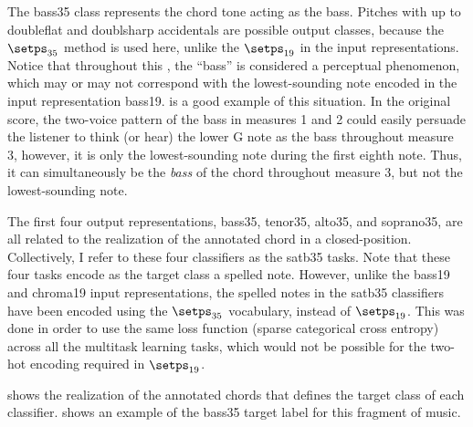 
The \gls{bass35} class represents the chord tone acting as
the bass. Pitches with up to \gls{doubleflat} and
\gls{doublsharp} accidentals are possible output classes,
because the $\setps_{35}$ method is used here, unlike the
$\setps_{19}$ in the input representations. Notice that
throughout this \thesisdiss{}, the ``bass'' is considered a
perceptual phenomenon, which may or may not correspond with
the lowest-sounding note encoded in the input representation
\gls{bass19}.  is a good example of
this situation. In the original score, the two-voice pattern
of the bass in measures 1 and 2 could easily persuade the
listener to think (or hear) the lower G note as the bass
throughout measure 3, however, it is only the
lowest-sounding note during the first eighth note. Thus, it
can simultaneously be the \emph{bass} of the chord
throughout measure 3, but not the lowest-sounding note.

The first four output representations, \gls{bass35},
\gls{tenor35}, \gls{alto35}, and \gls{soprano35}, are all
related to the realization of the annotated chord in a
\gls{closed-position}. Collectively, I refer to these four
classifiers as the \gls{satb35} tasks. Note that these four
tasks encode as the target class a spelled note. However,
unlike the \gls{bass19} and \gls{chroma19} input
representations, the spelled notes in the \gls{satb35}
classifiers have been encoded using the $\setps_{35}$
vocabulary, instead of $\setps_{19}$. This was done in order
to use the same loss function (sparse categorical cross
entropy) across all the multitask learning tasks, which
would not be possible for the two-hot encoding required in
$\setps_{19}$.

 shows the realization of the annotated
chords that defines the target class of each classifier.
 shows an example of the \gls{bass35}
target label for this fragment of music.




